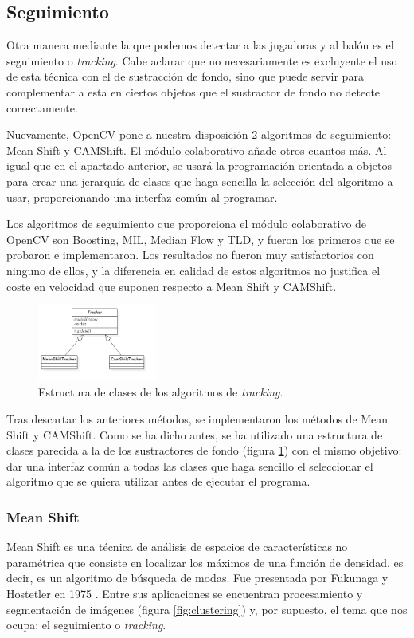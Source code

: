 \subsection{Seguimiento}
Otra manera mediante la que podemos detectar a las jugadoras y al balón es el seguimiento o \textit{tracking}. Cabe aclarar que no necesariamente es excluyente el uso de esta técnica con el de sustracción de fondo, sino que puede servir para complementar a esta en ciertos objetos que el sustractor de fondo no detecte correctamente.

Nuevamente, OpenCV pone a nuestra disposición 2 algoritmos de seguimiento: Mean Shift y CAMShift. El módulo colaborativo añade otros cuantos más. Al igual que en el apartado anterior, se usará la programación orientada a objetos para crear una jerarquía de clases que haga sencilla la selección del algoritmo a usar, proporcionando una interfaz común al programar.

Los algoritmos de seguimiento que proporciona el módulo colaborativo de OpenCV son Boosting, MIL, Median Flow y TLD, y fueron los primeros que se probaron e implementaron. Los resultados no fueron muy satisfactorios con ninguno de ellos, y la diferencia en calidad de estos algoritmos no justifica el coste en velocidad que suponen respecto a Mean Shift y CAMShift.

\begin{figure}
    \centering
    \includegraphics[width=0.35\textwidth]{images/trackers}
    \caption{Estructura de clases de los algoritmos de \textit{tracking}.}
    \label{fig:trackers}
\end{figure}

Tras descartar los anteriores métodos, se implementaron los métodos de Mean Shift y CAMShift. Como se ha dicho antes, se ha utilizado una estructura de clases parecida a la de los sustractores de fondo (figura \ref{fig:trackers}) con el mismo objetivo: dar una interfaz común a todas las clases que haga sencillo el seleccionar el algoritmo que se quiera utilizar antes de ejecutar el programa.

\subsubsection*{Mean Shift}
Mean Shift es una técnica de análisis de espacios de características no paramétrica que consiste en localizar los máximos de una función de densidad, es decir, es un algoritmo de búsqueda de modas. Fue presentada por Fukunaga y Hostetler en 1975 \cite{1055330}. Entre sus aplicaciones se encuentran procesamiento y segmentación de imágenes (figura \ref{fig:clustering}) y, por supuesto, el tema que nos ocupa: el seguimiento o \textit{tracking}.

